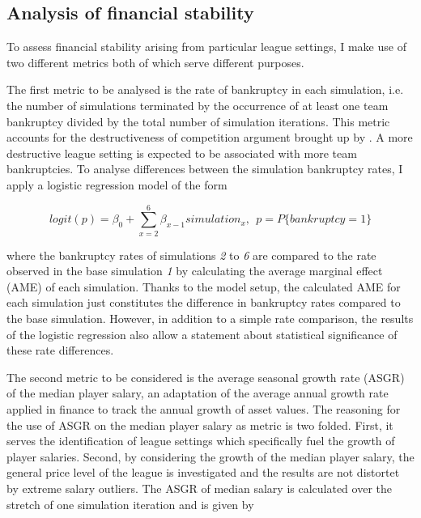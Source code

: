 \documentclass[12pt, a4paper]{article}
\begin{document}
\subsection{Analysis of financial stability}

To assess financial stability arising from particular league settings, I make use of two different metrics both of which serve different purposes.

\noindent
The first metric to be analysed is the rate of bankruptcy in each simulation, i.e. the number of simulations terminated by the occurrence of at least one team bankruptcy divided by the total number of simulation iterations. This metric accounts for the destructiveness of competition argument brought up by \cite{whitney_bidding_1993}. A more destructive league setting is expected to be associated with more team bankruptcies. To analyse differences between the simulation bankruptcy rates, I apply a logistic regression model of the form 

\begin{equation}
\label{eq:averageGrowthRate}
logit(p) = \beta_0 + \sum_{x=2}^6\beta_{x-1}simulation_x, \ \ p=P\{bankruptcy=1\}
\end{equation}

\noindent
where the bankruptcy rates of simulations \textit{2} to \textit{6} are compared to the rate observed in the base simulation \textit{1} by calculating the average marginal effect (AME) of each simulation. Thanks to the model setup, the calculated AME for each simulation just constitutes the difference in bankruptcy rates compared to the base simulation. However, in addition to a simple rate comparison, the results of the logistic regression also allow a statement about statistical significance of these rate differences. 

\noindent
The second metric to be considered is the average seasonal growth rate (ASGR) of the median player salary, an adaptation of the average annual growth rate applied in finance to track the annual growth of asset values. The reasoning for the use of ASGR on the median player salary as metric is two folded. First, it serves the identification of league settings which specifically fuel the growth of player salaries. Second, by considering the growth of the median player salary, the general price level of the league is investigated and the results are not distortet by extreme salary outliers. The ASGR of median salary is calculated over the stretch of one simulation iteration and is given by
\end{document}
